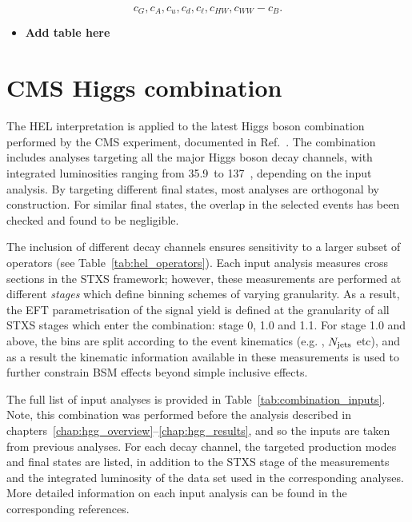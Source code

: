 \begin{equation}
    c_G, c_A, c_u, c_d, c_\ell, c_{HW}, c_{WW}-c_B.
\end{equation}

\begin{itemize}
    \item \textbf{Add table here}
\end{itemize}

\section{CMS Higgs combination}\label{sec:eft_combination}
The HEL interpretation is applied to the latest Higgs boson combination performed by the CMS experiment, documented in Ref.~\cite{CMS-PAS-HIG-19-005}. The combination includes analyses targeting all the major Higgs boson decay channels, with integrated luminosities ranging from 35.9~\fbinv to 137~\fbinv, depending on the input analysis. By targeting different final states, most analyses are orthogonal by construction. For similar final states, the overlap in the selected events has been checked and found to be negligible. 

The inclusion of different decay channels ensures sensitivity to a larger subset of operators (see Table~\ref{tab:hel_operators}). Each input analysis measures cross sections in the STXS framework; however, these measurements are performed at different \textit{stages} which define binning schemes of varying granularity.
As a result, the EFT parametrisation of the signal yield is defined at the granularity of all STXS stages which enter the combination: stage 0, 1.0 and 1.1. For stage 1.0 and above, the bins are split according to the event kinematics (e.g. \ptH, $N_{\rm{jets}}$ etc), and as a result the kinematic information available in these measurements is used to further constrain BSM effects beyond simple inclusive effects.

The full list of input analyses is provided in Table~\ref{tab:combination_inputs}. Note, this combination was performed before the \Hgg analysis described in chapters~\ref{chap:hgg_overview}--\ref{chap:hgg_results}, and so the \Hgg inputs are taken from previous analyses. For each decay channel, the targeted production modes and final states are listed, in addition to the STXS stage of the measurements and the integrated luminosity of the data set used in the corresponding analyses. More detailed information on each input analysis can be found in the corresponding references.

